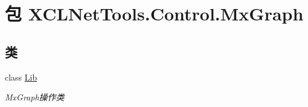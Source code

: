 \hypertarget{namespace_x_c_l_net_tools_1_1_control_1_1_mx_graph}{\section{包 X\-C\-L\-Net\-Tools.\-Control.\-Mx\-Graph}
\label{namespace_x_c_l_net_tools_1_1_control_1_1_mx_graph}
}
\subsection*{类}
\begin{DoxyCompactItemize}
\item 
class \hyperlink{class_x_c_l_net_tools_1_1_control_1_1_mx_graph_1_1_lib}{Lib}
\begin{DoxyCompactList}\small\item\em Mx\-Graph操作类 \end{DoxyCompactList}\end{DoxyCompactItemize}
